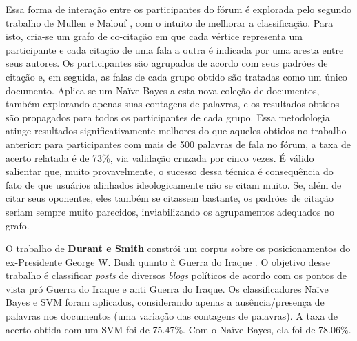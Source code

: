 

Essa forma de interação entre os participantes do fórum é explorada pelo segundo trabalho de Mullen e Malouf \cite{malouf-taking_sides}, com o intuito de melhorar a classificação. Para isto, cria-se um grafo de co-citação em que cada vértice representa um participante e cada citação de uma fala a outra é indicada por uma aresta entre seus autores. Os participantes são agrupados de acordo com seus padrões de citação e, em seguida, as falas de cada grupo obtido são tratadas como um único documento. Aplica-se um Naïve Bayes a esta nova coleção de documentos, também explorando apenas suas contagens de palavras, e os resultados obtidos são propagados para todos os participantes de cada grupo. Essa metodologia atinge resultados significativamente melhores do que aqueles obtidos no trabalho anterior: para participantes com mais de 500 palavras de fala no fórum, a taxa de acerto relatada é de 73\%, via validação cruzada por cinco vezes. É válido salientar que, muito provavelmente, o sucesso dessa técnica é consequência do fato de que usuários alinhados ideologicamente não se citam muito. Se, além de citar seus oponentes, eles também se citassem bastante, os padrões de citação seriam sempre muito parecidos, inviabilizando os agrupamentos adequados no grafo.

O trabalho de \textbf{Durant e Smith} constrói um corpus sobre os posicionamentos do ex-Presidente George W. Bush quanto à Guerra do Iraque \cite{durant-smith}. O objetivo desse trabalho é classificar \emph{posts} de diversos \emph{blogs} políticos de acordo com os pontos de vista pró Guerra do Iraque e anti Guerra do Iraque.  Os classificadores Naïve Bayes e SVM foram aplicados, considerando apenas a ausência/presença de palavras nos documentos (uma variação das contagens de palavras). A taxa de acerto obtida com um SVM foi de 75.47\%. Com o Naïve Bayes, ela foi de 78.06\%. 

